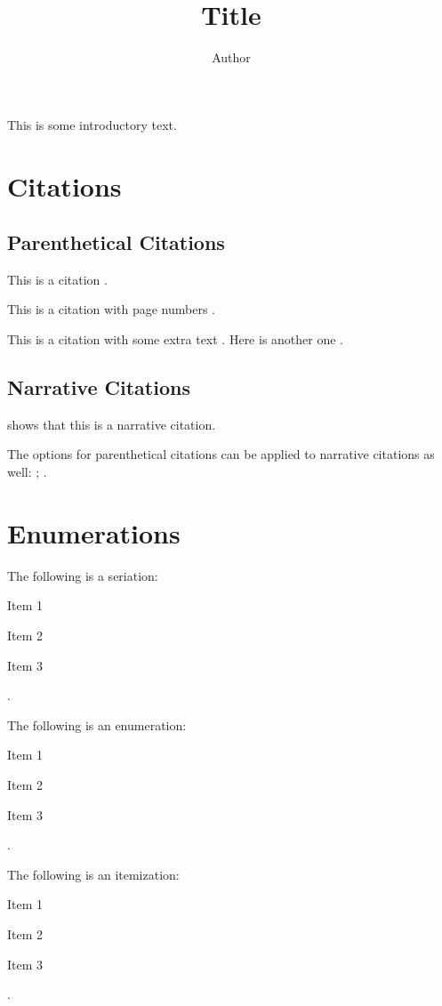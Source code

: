 \documentclass[stu,12pt,a4paper,biblatex,floatsintext]{apa7}
\title{Title}
\author{Author}
\affiliation{Affiliation}
\begin{document}
\maketitle

This is some introductory text.

\section{Citations}

\subsection{Parenthetical Citations}

This is a citation \parencite{example1970}.

This is a citation with page numbers \parencite[1-2]{example1970}.

This is a citation with some extra text \parencite[Appendix A]{example1970}. Here is another one \parencite[ch. 1 p. 1]{example1970}.

\subsection{Narrative Citations}

\textcite{example1970} shows that this is a narrative citation.

The options for parenthetical citations can be applied to narrative citations as well: \textcite[1-2]{example1970}; \textcite[Appendix A]{example1970}.

\section{Enumerations}

The following is a seriation: \begin{seriate}
	\item Item 1
	\item Item 2
	\item Item 3
\end{seriate}.

The following is an enumeration: \begin{APAenumerate}
	\item Item 1
	\item Item 2
	\item Item 3
\end{APAenumerate}.

The following is an itemization: \begin{APAitemize}
	\item Item 1
	\item Item 2
	\item Item 3
\end{APAitemize}.

\printbibliography
\end{document}
